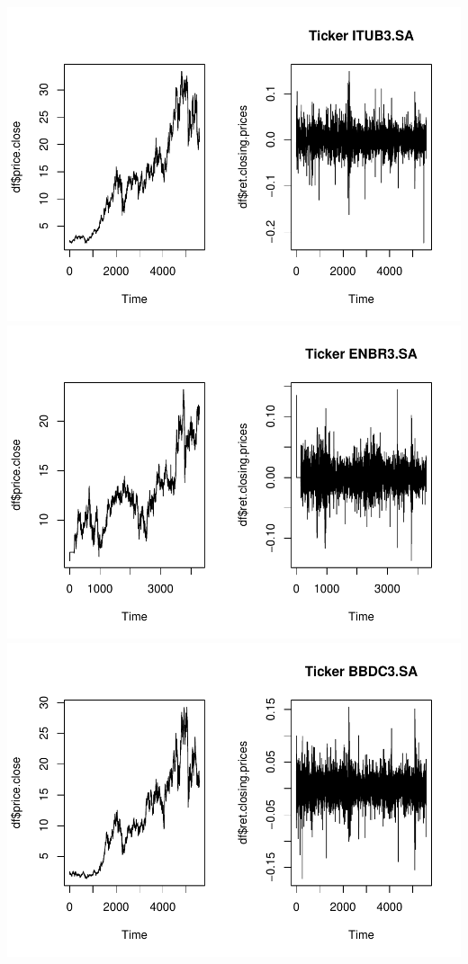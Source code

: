 \documentclass[
]{article}
\begin{document}
\includegraphics{work_files/figure-latex/unnamed-chunk-3-1.pdf}
\includegraphics{work_files/figure-latex/unnamed-chunk-3-2.pdf}
\includegraphics{work_files/figure-latex/unnamed-chunk-3-3.pdf}
\end{document}
